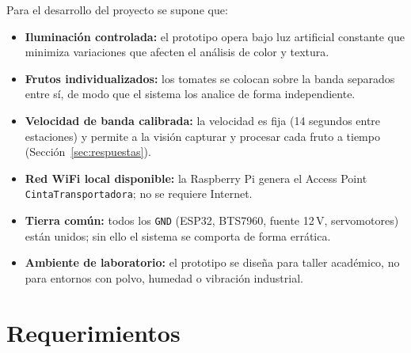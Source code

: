 \documentclass[12pt]{catolica_proyectos}
\begin{document}
Para el desarrollo del proyecto se supone que:
\begin{itemize}
  \item \textbf{Iluminación controlada:} el prototipo opera bajo luz artificial constante que minimiza variaciones que afecten el análisis de color y textura.
  \item \textbf{Frutos individualizados:} los tomates se colocan sobre la banda separados entre sí, de modo que el sistema los analice de forma independiente.
  \item \textbf{Velocidad de banda calibrada:} la velocidad es fija (14 segundos entre estaciones) y permite a la visión capturar y procesar cada fruto a tiempo (Sección~\ref{sec:respuestas}).
  \item \textbf{Red WiFi local disponible:} la Raspberry Pi genera el Access Point \texttt{CintaTransportadora}; no se requiere Internet.
  \item \textbf{Tierra común:} todos los \texttt{GND} (ESP32, BTS7960, fuente 12\,V, servomotores) están unidos; sin ello el sistema se comporta de forma errática.
  \item \textbf{Ambiente de laboratorio:} el prototipo se diseña para taller académico, no para entornos con polvo, humedad o vibración industrial.
\end{itemize}

\section{Requerimientos}
\end{document}
